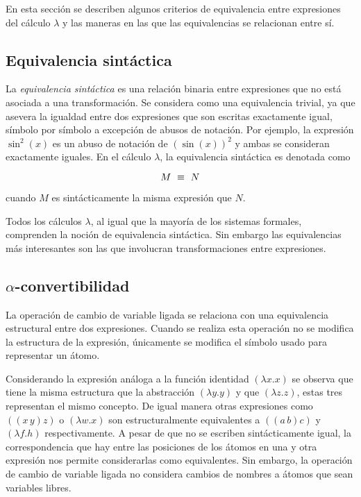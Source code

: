 En esta sección se describen algunos criterios de equivalencia entre expresiones del cálculo \( λ \) y las maneras en las que las equivalencias se relacionan entre sí.

\subsection{Equivalencia sintáctica}
\label{sec:equivalencia-sintactica}

La \emph{equivalencia sintáctica} es una relación binaria entre expresiones que no está asociada a una transformación. Se considera como una equivalencia trivial, ya que asevera la igualdad entre dos expresiones que son escritas exactamente igual, símbolo por símbolo a excepción de abusos de notación. Por ejemplo, la expresión \( \sin^{2}(x) \) es un abuso de notación de \( \left( \sin(x) \right)^{2} \) y ambas se consideran exactamente iguales. En el cálculo \( λ \), la equivalencia sintáctica es denotada como

\[ M \ \equiv\  N \]

cuando \( M \) es sintácticamente la misma expresión que \( N \).

Todos los cálculos \( λ \), al igual que la mayoría de los sistemas formales, comprenden la noción de equivalencia sintáctica. Sin embargo las equivalencias más interesantes son las que involucran transformaciones entre expresiones.

\subsection{\texorpdfstring{\( α \)-convertibilidad}{alfa-convertibilidad}}
\label{sec:alfa-convertibilidad}

La operación de cambio de variable ligada se relaciona con una equivalencia estructural entre dos expresiones. Cuando se realiza esta operación no se modifica la estructura de la expresión, únicamente se modifica el símbolo usado para representar un átomo.

Considerando la expresión análoga a la función identidad \( (λx.x) \) se observa que tiene la misma estructura que la abstracción \( (λy.y) \) y que \( (λz.z) \), estas tres representan el mismo concepto. De igual manera otras expresiones como \( ((x\, y)z) \) o \( (λw.x) \) son estructuralmente equivalentes a \( ((a\, b)c) \) y \( (λf.h) \) respectivamente. A pesar de que no se escriben sintácticamente igual, la correspondencia que hay entre las posiciones de los átomos en una y otra expresión nos permite considerarlas como equivalentes. Sin embargo, la operación de cambio de variable ligada no considera cambios de nombres a átomos que sean variables libres.

